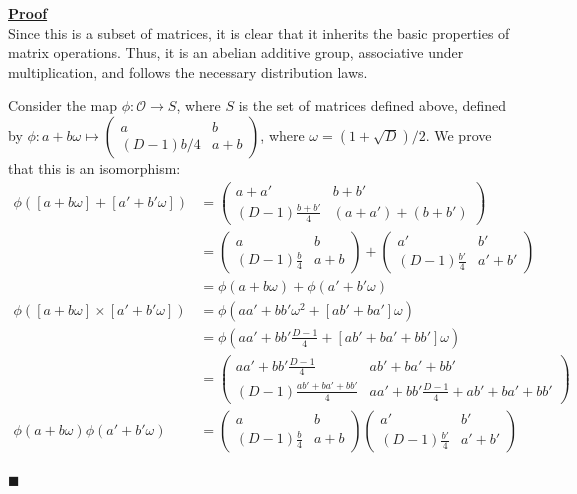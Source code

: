 \documentclass[12pt,a4paper]{article}
\newenvironment{proof}
{
\textbf{\underline{Proof}} \\
}
{
\begin{flushright}
$\blacksquare$
\end{flushright}}
\begin{document}
\begin{proof}
	Since this is a subset of matrices, it is clear that it inherits the basic properties of matrix operations.
	Thus, it is an abelian additive group, associative under multiplication, and follows the necessary distribution laws.
	
	Consider the map $\phi: \mathcal{O} \to S$, where $S$ is the set of matrices defined above, defined by $\phi: a + b\omega \mapsto \begin{pmatrix}
		a & b \\
		(D-1)b/4 & a+b
	\end{pmatrix}$, where $\omega = (1 + \sqrt{D})/2$.
	We prove that this is an isomorphism:
	\begin{align*}
		\phi([a + b\omega] + [a' + b'\omega]) &= 
		\begin{pmatrix}
			a + a' & b + b' \\
			(D-1)\frac{b + b'}{4} & (a + a') + (b + b') 
		\end{pmatrix}
		\\
		&=
		\begin{pmatrix}
			a & b \\
			(D-1)\frac{b}{4} & a + b
		\end{pmatrix}
		+
		\begin{pmatrix}
			a' & b' \\
			(D-1)\frac{b'}{4} & a' + b'
		\end{pmatrix} \\
		&= \phi(a + b\omega) + \phi(a' + b'\omega) \\		
		\phi([a + b\omega] \times [a' + b'\omega]) &= \phi(aa' + bb'\omega^2 + [ab' + ba']\omega) \\
		&= \phi(aa' + bb'\frac{D-1}{4} + [ab' + ba' + bb']\omega) \\
		&= 
		\begin{pmatrix}
			aa' + bb'\frac{D-1}{4} & ab' + ba' + bb' \\
			(D-1)\frac{ab' + ba' + bb'}{4} & aa' + bb'\frac{D-1}{4} + ab' + ba' + bb'
		\end{pmatrix} \\
		\phi(a + b\omega)\phi(a' + b'\omega) &= 
		\begin{pmatrix}
			a & b \\
			(D-1)\frac{b}{4} & a + b
		\end{pmatrix}
		\begin{pmatrix}
			a' & b' \\
			(D-1)\frac{b'}{4} & a' + b'
		\end{pmatrix} \\

\end{align*}
\end{proof}
\end{document}
